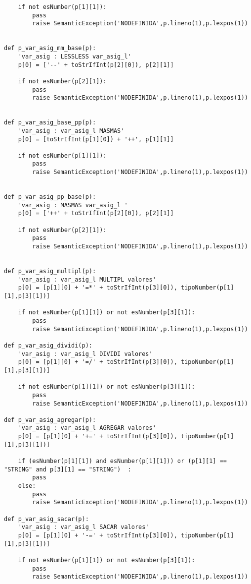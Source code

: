 \begin{verbatim}
    if not esNumber(p[1][1]):
        pass
        raise SemanticException('NODEFINIDA',p.lineno(1),p.lexpos(1))


def p_var_asig_mm_base(p):
    'var_asig : LESSLESS var_asig_l'
    p[0] = ['--' + toStrIfInt(p[2][0]), p[2][1]]

    if not esNumber(p[2][1]):
        pass
        raise SemanticException('NODEFINIDA',p.lineno(1),p.lexpos(1))


def p_var_asig_base_pp(p):
    'var_asig : var_asig_l MASMAS'
    p[0] = [toStrIfInt(p[1][0]) + '++', p[1][1]]

    if not esNumber(p[1][1]):
        pass
        raise SemanticException('NODEFINIDA',p.lineno(1),p.lexpos(1))


def p_var_asig_pp_base(p):
    'var_asig : MASMAS var_asig_l '
    p[0] = ['++' + toStrIfInt(p[2][0]), p[2][1]]

    if not esNumber(p[2][1]):
        pass
        raise SemanticException('NODEFINIDA',p.lineno(1),p.lexpos(1))


def p_var_asig_multipl(p):
    'var_asig : var_asig_l MULTIPL valores'
    p[0] = [p[1][0] + '=*' + toStrIfInt(p[3][0]), tipoNumber(p[1][1],p[3][1])]

    if not esNumber(p[1][1]) or not esNumber(p[3][1]):
        pass
        raise SemanticException('NODEFINIDA',p.lineno(1),p.lexpos(1))

def p_var_asig_dividi(p):
    'var_asig : var_asig_l DIVIDI valores'
    p[0] = [p[1][0] + '=/' + toStrIfInt(p[3][0]), tipoNumber(p[1][1],p[3][1])]

    if not esNumber(p[1][1]) or not esNumber(p[3][1]):
        pass
        raise SemanticException('NODEFINIDA',p.lineno(1),p.lexpos(1))

def p_var_asig_agregar(p):
    'var_asig : var_asig_l AGREGAR valores'
    p[0] = [p[1][0] + '+=' + toStrIfInt(p[3][0]), tipoNumber(p[1][1],p[3][1])]

    if (esNumber(p[1][1]) and esNumber(p[1][1])) or (p[1][1] == "STRING" and p[3][1] == "STRING")  :
        pass
    else:
        pass
        raise SemanticException('NODEFINIDA',p.lineno(1),p.lexpos(1))

def p_var_asig_sacar(p):
    'var_asig : var_asig_l SACAR valores'
    p[0] = [p[1][0] + '-=' + toStrIfInt(p[3][0]), tipoNumber(p[1][1],p[3][1])]

    if not esNumber(p[1][1]) or not esNumber(p[3][1]):
        pass
        raise SemanticException('NODEFINIDA',p.lineno(1),p.lexpos(1))


\end{verbatim}
